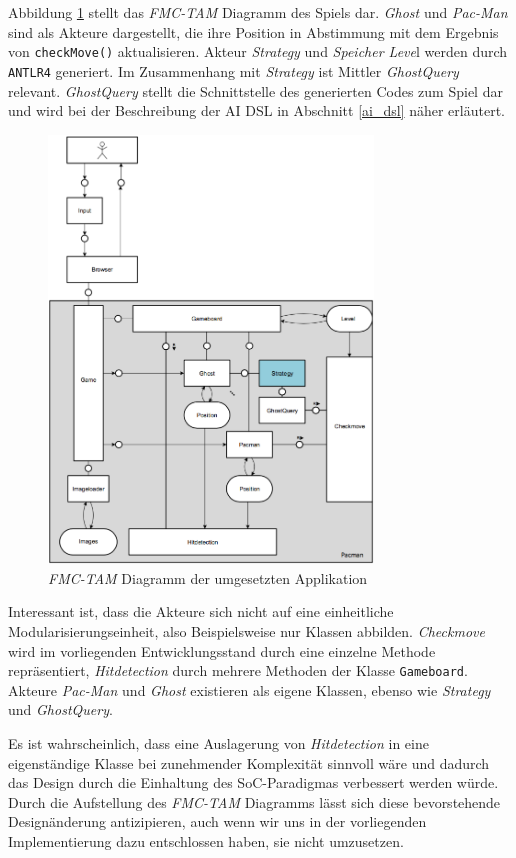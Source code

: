 \documentclass[conference]{IEEEtran}
\begin{document}
Abbildung \ref{fmc_tam} stellt das \emph{FMC-TAM} Diagramm des Spiels dar. \emph{Ghost} und \emph{Pac-Man} sind als Akteure dargestellt, die ihre Position in Abstimmung mit dem Ergebnis von \texttt{checkMove()} aktualisieren. Akteur \emph{Strategy} und \emph{Speicher Leve}l werden durch \texttt{ANTLR4} generiert. Im Zusammenhang mit \emph{Strategy} ist Mittler \emph{GhostQuery} relevant. \emph{GhostQuery} stellt die Schnittstelle des generierten Codes zum Spiel dar und wird bei der Beschreibung der AI DSL in Abschnitt \ref{ai_dsl} näher erläutert.

\begin{figure}[!t]
\centering
\includegraphics[width=3.4in]{tam.png}

\caption{\emph{FMC-TAM} Diagramm der umgesetzten Applikation}
\label{fmc_tam}
\end{figure}

Interessant ist, dass die Akteure sich nicht auf eine einheitliche Modularisierungseinheit, also Beispielsweise nur Klassen abbilden. \emph{Checkmove} wird im vorliegenden Entwicklungsstand durch eine einzelne Methode repräsentiert, \emph{Hitdetection} durch mehrere Methoden der Klasse \texttt{Gameboard}. Akteure \emph{Pac-Man} und \emph{Ghost} existieren als eigene Klassen, ebenso wie \emph{Strategy} und \emph{GhostQuery}.

Es ist wahrscheinlich, dass eine Auslagerung von \emph{Hitdetection} in eine eigenständige Klasse bei zunehmender Komplexität sinnvoll wäre und dadurch das Design durch die Einhaltung des SoC-Paradigmas verbessert werden würde. Durch die Aufstellung des \emph{FMC-TAM} Diagramms lässt sich diese bevorstehende Designänderung antizipieren, auch wenn wir uns in der vorliegenden Implementierung dazu entschlossen haben, sie nicht umzusetzen.
\end{document}

